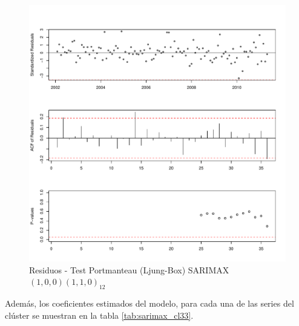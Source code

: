 \documentclass[12pt,oneside]{book}\usepackage[]{graphicx}\usepackage[]{color}
\makeatletter
\def\maxwidth{ %
  \ifdim\Gin@nat@width>\linewidth
    \linewidth
  \else
    \Gin@nat@width
  \fi
}
\newenvironment{knitrout}{}{} %
\theoremstyle{definition} %
\makeatother
\begin{document}
\begin{knitrout}
\color{fgcolor}\begin{figure}[h]

{\centering \includegraphics[width=\maxwidth]{figure/unnamed-chunk-108-1} 

}

\caption[Residuos - Test Portmanteau (Ljung-Box) SARIMAX$(1,0,0)(1,1,0)_{12}$]{Residuos - Test Portmanteau (Ljung-Box) SARIMAX$(1,0,0)(1,1,0)_{12}$}\label{fig:unnamed-chunk-108}
\end{figure}


\end{knitrout}


Además, los coeficientes estimados del modelo, para cada una de las series del clúster se muestran en la tabla \ref{tab:sarimax_cl33}.
\end{document}
